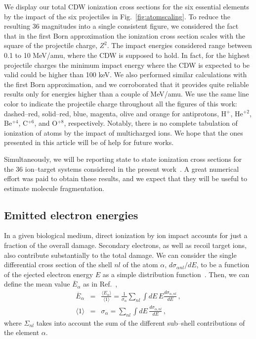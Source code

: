 \documentclass[preprint,showpacs]{revtex4}
\begin{document}
We display our total CDW ionization cross sections for the six essential 
elements by the impact of the six projectiles in Fig.~\ref{fig:atomscaling}.
To reduce the resulting 36 magnitudes into a single consistent 
figure, we considered the fact that in the first Born approximation
the ionization cross section scales with the square of the projectile 
charge, $Z^{2}$. The impact energies considered 
range between 0.1 to 10 MeV/amu, where the CDW is supposed 
to hold. In fact, for the highest projectile charges the minimum 
impact energy where the CDW is expected to be valid could be 
higher than 100 keV. We also performed similar calculations with the 
first Born approximation, and we corroborated that it provides quite 
reliable results only for energies higher than a couple of MeV/amu. 
We use the same line color to indicate the projectile charge throughout 
all the figures of this work: dashed--red, solid--red, blue, magenta, 
olive and orange for antiprotons, H$^{+}$, He$^{+2}$, Be$^{+4}$, 
C$^{+6}$, and O$^{+8}$, respectively. Notably, there is no complete 
tabulation of ionization of atoms by the impact of multicharged ions. 
We hope that the ones presented in this article will be of help for 
future works.

Simultaneously, we will be reporting state to state ionization cross 
sections for the 36 ion--target systems considered in the present 
work~\cite{miraglia2019}. A great numerical effort was paid to obtain 
these results, and we expect that they will be useful to estimate 
molecule fragmentation.

\subsection{Emitted electron energies}
\label{subsec:meanener}

In a given biological medium, direct ionization by ion impact accounts 
for just a fraction of the overall damage. Secondary electrons, as well 
as recoil target ions, also contribute substantially to the total damage. 
We can consider the single differential cross section of the shell 
$nl$ of the atom $\alpha$, $d\sigma_{\alpha nl}/dE$, to be a function 
of the ejected electron energy $E$ as a simple distribution 
function~\cite{surdutovic2018}. Then, we can define the mean value 
$\overline{E}_{\alpha}$ as in Ref.~\cite{abril2015},
\begin{eqnarray}
\overline{E}_{\alpha} &=&\frac{\langle E_{\alpha}\rangle}{\langle
1\rangle}=\frac{1}{\sigma_{\alpha}}\sum\limits_{nl}\int dE\,E
\frac{d\sigma_{\alpha,nl}}{dE}\,,  
\label{40} \\
\langle 1\rangle &=&\sigma_{\alpha}=\sum\limits_{nl}\int dE\,
\frac{d\sigma_{\alpha,nl}}{dE}\,,  
\label{50}
\end{eqnarray}
where $\Sigma_{nl}$ takes into account the sum of the different 
sub--shell contributions of the element $\alpha$.
\end{document}
